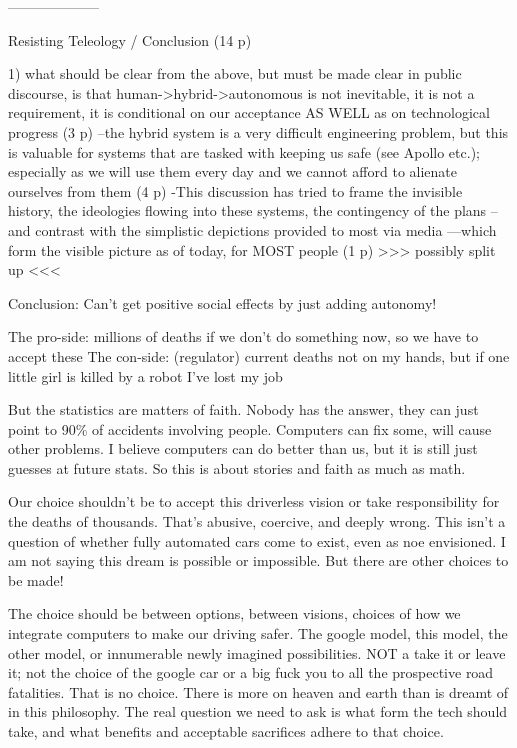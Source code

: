 --------------------

Resisting Teleology / Conclusion (14 p)

1) what should be clear from the above, but must be made clear in
public discourse, is that human->hybrid->autonomous is not inevitable,
it is not a requirement, it is conditional on our acceptance AS WELL
as on technological progress (3 p)
--the hybrid system is a very difficult engineering problem, but this
is valuable for systems that are tasked with keeping us safe (see
Apollo etc.); especially as we will use them every day and we cannot
afford to alienate ourselves from them (4 p)
-This discussion has tried to frame the invisible history, the
ideologies flowing into these systems, the contingency of the plans
--and contrast with the simplistic depictions provided to most via
media
---which form the visible picture as of today, for MOST people (1 p)
>>> possibly split up <<<




Conclusion:
Can't get positive social effects by just adding autonomy!

The pro-side: millions of deaths if we don't do something now, so we
have to accept these
The con-side: (regulator) current deaths not on my hands, but if one
little girl is killed by a robot I've lost my job

But the statistics are matters of faith. Nobody has the answer, they
can just point to 90\% of accidents involving people. Computers can fix
                     some, will cause other problems. I believe
                     computers can do better than us, but it is still
                     just guesses at future stats. So this is about
                     stories and faith as much as math.

Our choice shouldn't be to accept this driverless vision or take
responsibility for the deaths of thousands. That's abusive, coercive,
and deeply wrong. This isn't a question of whether fully automated
cars come to exist, even as noe envisioned. I am not saying this dream
is possible or impossible. But there are other choices to be made!

The choice should be between options, between visions, choices of how
we integrate computers to make our driving safer. The google model,
this model, the other model, or innumerable newly imagined
possibilities. NOT a take it or leave it; not the choice of the google
car or a big fuck you to all the prospective road fatalities. That is
no choice. There is more on heaven and earth than is dreamt of in this
philosophy. The real question we need to ask is what form the tech
should take, and what benefits and acceptable sacrifices adhere to
that choice.

